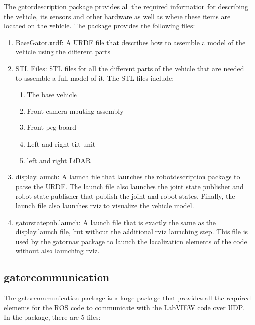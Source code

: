 The gator\textunderscore description package provides all the required information for describing the vehicle, its sensors and other hardware as well as where these items are located on the vehicle. The package provides the following files:

\begin{enumerate}
\item BaseGator.urdf: A URDF file that describes how to assemble a model of the vehicle using the different parts
\item STL Files: STL files for all the different parts of the vehicle that are needed to assemble a full model of it. The STL files include:
\begin{enumerate}
\item The base vehicle
\item Front camera mouting assembly
\item Front peg board
\item Left and right tilt unit
\item left and right LiDAR
\end{enumerate}
\item display.launch: A launch file that launches the robot\textunderscore description package to parse the URDF. The launch file also launches the joint state publisher and robot state publisher that publish the joint and robot states. Finally, the launch file also launches rviz to visualize the vehicle model.
\item gator\textunderscore state\textunderscore pub.launch: A launch file that is exactly the same as the display.launch file, but without the additional rviz launching step. This file is used by the gator\textunderscore nav package to launch the localization elements of the code without also launching rviz.
\end{enumerate}

\subsection{gator\textunderscore communication}

The gator\textunderscore communication package is a large package that provides all the required elements for the ROS code to communicate with the LabVIEW code over UDP. In the package, there are 5 files:

